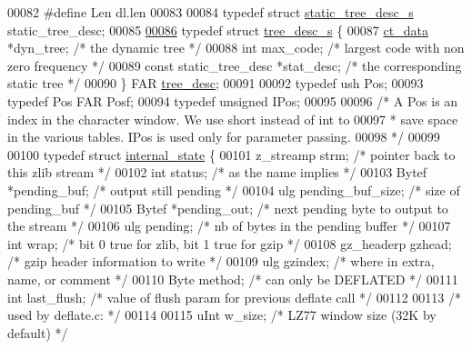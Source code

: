 \begin{DoxyCode}
00082 \textcolor{preprocessor}{#define Len  dl.len}
00083 
00084 \textcolor{keyword}{typedef} \textcolor{keyword}{struct }\hyperlink{structstatic__tree__desc__s}{static\_tree\_desc\_s}  static\_tree\_desc;
00085 
\hyperlink{structtree__desc__s}{00086} \textcolor{keyword}{typedef} \textcolor{keyword}{struct }\hyperlink{structtree__desc__s}{tree\_desc\_s} \{
00087     \hyperlink{structct__data__s}{ct\_data} *dyn\_tree;           \textcolor{comment}{/* the dynamic tree */}
00088     \textcolor{keywordtype}{int}     max\_code;            \textcolor{comment}{/* largest code with non zero frequency */}
00089     \textcolor{keyword}{const} static\_tree\_desc *stat\_desc;  \textcolor{comment}{/* the corresponding static tree */}
00090 \} FAR \hyperlink{structtree__desc__s}{tree\_desc};
00091 
00092 \textcolor{keyword}{typedef} ush Pos;
00093 \textcolor{keyword}{typedef} Pos FAR Posf;
00094 \textcolor{keyword}{typedef} \textcolor{keywordtype}{unsigned} IPos;
00095 
00096 \textcolor{comment}{/* A Pos is an index in the character window. We use short instead of int to}
00097 \textcolor{comment}{ * save space in the various tables. IPos is used only for parameter passing.}
00098 \textcolor{comment}{ */}
00099 
00100 \textcolor{keyword}{typedef} \textcolor{keyword}{struct }\hyperlink{structinternal__state}{internal\_state} \{
00101     z\_streamp strm;      \textcolor{comment}{/* pointer back to this zlib stream */}
00102     \textcolor{keywordtype}{int}   status;        \textcolor{comment}{/* as the name implies */}
00103     Bytef *pending\_buf;  \textcolor{comment}{/* output still pending */}
00104     ulg   pending\_buf\_size; \textcolor{comment}{/* size of pending\_buf */}
00105     Bytef *pending\_out;  \textcolor{comment}{/* next pending byte to output to the stream */}
00106     ulg   pending;       \textcolor{comment}{/* nb of bytes in the pending buffer */}
00107     \textcolor{keywordtype}{int}   wrap;          \textcolor{comment}{/* bit 0 true for zlib, bit 1 true for gzip */}
00108     gz\_headerp  gzhead;  \textcolor{comment}{/* gzip header information to write */}
00109     ulg   gzindex;       \textcolor{comment}{/* where in extra, name, or comment */}
00110     Byte  method;        \textcolor{comment}{/* can only be DEFLATED */}
00111     \textcolor{keywordtype}{int}   last\_flush;    \textcolor{comment}{/* value of flush param for previous deflate call */}
00112 
00113                 \textcolor{comment}{/* used by deflate.c: */}
00114 
00115     uInt  w\_size;        \textcolor{comment}{/* LZ77 window size (32K by default) */}

\end{DoxyCode}
